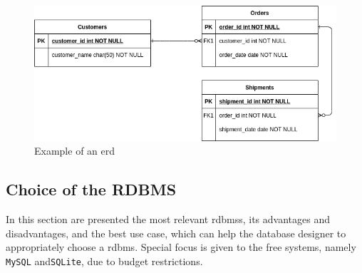 %
\begin{figure}[htb!]
\centering
    \includegraphics[width=0.8\columnwidth]{./img/erd-example.png}
  \caption{Example of an \gls{erd}}%
\label{fig:erd-example}
\end{figure}
%




\subsection{Choice of the RDBMS}
\label{sec:choice-rdbms}
In this section are presented the most relevant \glspl{rdbms}, its advantages
and disadvantages, and the best use case, which can help the database designer
to appropriately choose a \gls{rdbms}. Special focus is given to the free
systems, namely \texttt{MySQL} and\texttt{SQLite}, due to budget restrictions.

